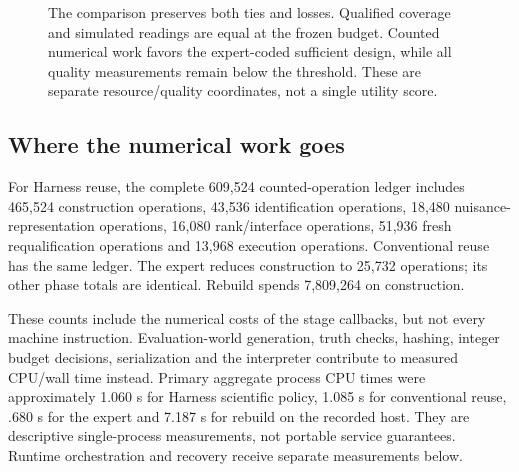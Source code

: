 \documentclass[11pt]{article}
\begin{document}
\begin{figure}[htbp]


\caption{The comparison preserves both ties and losses. Qualified coverage and simulated readings are equal at the frozen budget. Counted numerical work favors the expert-coded sufficient design, while all quality measurements remain below the threshold. These are separate resource/quality coordinates, not a single utility score.}
\label{fig:comparison}
\end{figure}

\subsection{Where the numerical work goes}

For Harness reuse, the complete 609,524 counted-operation ledger includes 465,524 construction operations, 43,536 identification operations, 18,480 nuisance-representation operations, 16,080 rank/interface operations, 51,936 fresh requalification operations and 13,968 execution operations. Conventional reuse has the same ledger. The expert reduces construction to 25,732 operations; its other phase totals are identical. Rebuild spends 7,809,264 on construction.

These counts include the numerical costs of the stage callbacks, but not every machine instruction. Evaluation-world generation, truth checks, hashing, integer budget decisions, serialization and the interpreter contribute to measured CPU/wall time instead. Primary aggregate process CPU times were approximately 1.060 s for Harness scientific policy, 1.085 s for conventional reuse, .680 s for the expert and 7.187 s for rebuild on the recorded host. They are descriptive single-process measurements, not portable service guarantees. Runtime orchestration and recovery receive separate measurements below.
\end{document}
